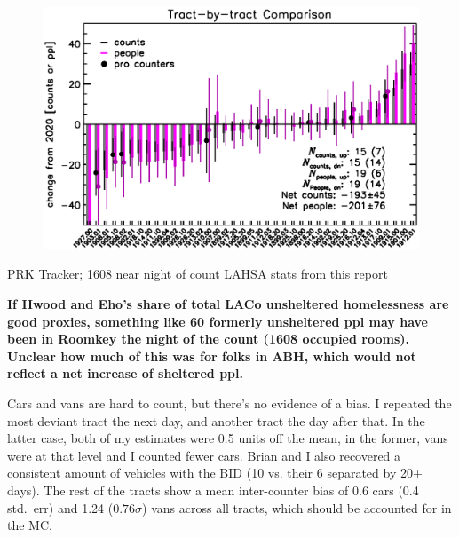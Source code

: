 \documentclass[11pt]{article}
\def\bfr{\bf\color{red}}
\begin{document}
\begin{figure}[]
	\centering
	\includegraphics[width = \textwidth, trim = 0cm 0cm 0cm 0cm]{tractsYrYr}
	\caption{}
	\label{fig:tcomp}
\end{figure}

\href{https://projectroomkeytracker.com/}{PRK Tracker; 1608 near night of count}
\href{https://www.lahsa.org/documents?id=4686-2020-greater-los-angeles-city-community-homelessness-report-service-planning-area-4.pdf}{LAHSA stats from this report}

{\bfr If Hwood and Eho's share of total LACo unsheltered homelessness are good proxies, something
like 60 formerly unsheltered ppl may have been in Roomkey the night of the count (1608 occupied rooms). 
Unclear how much of this was for folks in ABH, which would not reflect a net increase of sheltered ppl.}

Cars and vans are hard to count, but there's no evidence of a bias. I repeated the most deviant tract the next day, 
and another tract the day after that. In the latter case, both of my estimates were 0.5 units off the mean, in the 
former, vans were at that level and I counted fewer cars. Brian and I also recovered a consistent amount of vehicles 
with the BID (10 vs. their 6 separated by 20+ days). The rest of the tracts show a mean inter-counter bias of 0.6 
cars (0.4 std.~err) and 1.24 ($0.76\sigma$) vans across all tracts, which should be accounted for in the MC.
\end{document}
